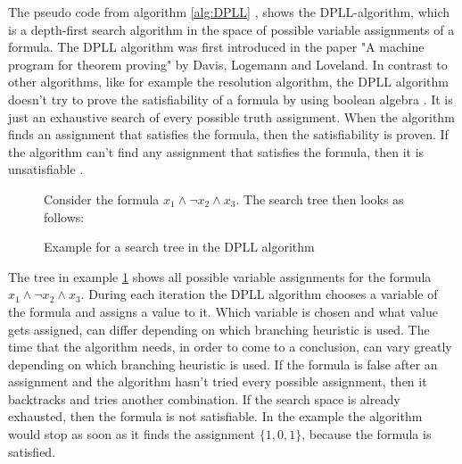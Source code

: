 The pseudo code from algorithm \ref{alg:DPLL} \cite{biere2009handbook}, shows the DPLL-algorithm, which is a depth-first search algorithm in the space of possible variable assignments of a formula. The DPLL algorithm was first introduced in the paper "A machine program for theorem proving" \cite{davis1962machine} by Davis, Logemann and Loveland. In contrast to other algorithms, like for example the resolution algorithm, the DPLL algorithm doesn't try to prove the satisfiability of a formula by using boolean algebra \cite{biere2009handbook}. It is just an exhaustive search of every possible truth assignment. When the algorithm finds an assignment that satisfies the formula, then the satisfiability is proven. If the algorithm can't find any assignment that satisfies the formula, then it is unsatisfiable \cite{biere2009handbook}.

\begin{figure}[!htb]
\begin{leftbar}
Consider the formula $x_1 \wedge \neg x_2 \wedge x_3$. The search tree then looks as follows:\\
\centering
{}
\end{leftbar}
\caption{Example for a search tree in the DPLL algorithm}
\label{ex:SearchTree}
\end{figure}

The tree in example \ref{ex:SearchTree} shows all possible variable assignments for the formula $x_1 \wedge \neg x_2 \wedge x_3$. During each iteration the DPLL algorithm chooses a variable of the formula and assigns a value to it. Which variable is chosen and what value gets assigned, can differ depending on which branching heuristic is used. The time that the algorithm needs, in order to come to a conclusion, can vary greatly depending on which branching heuristic is used. If the formula is false after an assignment and the algorithm hasn't tried every possible assignment, then it backtracks and tries another combination. If the search space is already exhausted, then the formula is not satisfiable. In the example the algorithm would stop as soon as it finds the assignment $\{1,0,1\}$, because the formula is satisfied.

